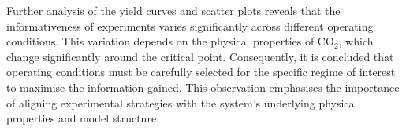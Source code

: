 \documentclass[a4paper,fleqn]{cas-dc}
\begin{document}
		Further analysis of the yield curves and scatter plots reveals that the informativeness of experiments varies significantly across different operating conditions. This variation depends on the physical properties of CO$_2$, which change	significantly around the critical point. Consequently, it is concluded that operating conditions must be carefully selected for the specific regime of interest to maximise the information gained. This observation emphasises the importance of aligning experimental strategies with the system’s underlying physical properties and model structure.

%



%

\end{document}
